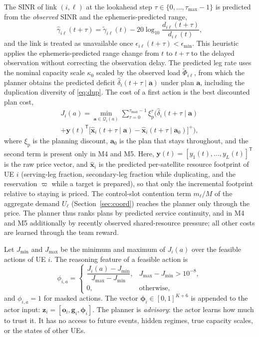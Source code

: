 \documentclass[journal]{IEEEtran}
\begin{document}
The SINR of link $(i,\ell)$ at the lookahead step
$\tau\in\{0,\dots,\tau_{\max}-1\}$ is predicted from the \emph{observed} SINR
and the ephemeris-predicted range,
\begin{equation}
\hat\gamma_{i\ell}(t+\tau)=\tilde\gamma_{i\ell}(t)-20\log_{10}\frac{d_{i\ell}(t+\tau)}{d_{i\ell}(t)},
\end{equation}
and the link is treated as unavailable once $\epsilon_{i\ell}(t+\tau)<\epsilon_{\min}$.
This heuristic applies the ephemeris-predicted range change from $t$ to
$t+\tau$ to the delayed observation without correcting the observation
delay.
The predicted leg rate uses the nominal capacity scale $\kappa_0$ scaled by the
observed load $\tilde\Phi_{i\ell}$, from which the planner obtains the
predicted deficit $\hat\delta_i(t+\tau\mid\mathbf{a})$ under plan
$\mathbf{a}$, including the duplication diversity of \eqref{eq:dup}. The cost
of a first action is the best discounted plan cost,
\begin{multline}
J_i(a)=\min_{\mathbf{a}\in\mathcal{Q}_i(a)}\sum_{\tau=0}^{\tau_{\max}-1}\xi_{\mathrm{p}}^\tau\Big(\hat\delta_i(t+\tau\mid\mathbf{a})\\
+\mathbf{y}(t)^{\mathsf T}\big[\hat{\mathbf{x}}_i(t+\tau\mid\mathbf{a})-\hat{\mathbf{x}}_i(t+\tau\mid\mathbf{a}_0)\big]^+\Big),
\label{eq:plancost}
\end{multline}
where $\xi_{\mathrm{p}}$ is the planning discount, $\mathbf{a}_0$ is the plan
that stays throughout, and the second term is present only in M4 and M5. Here,
$\mathbf{y}(t)=[y_1(t),\ldots,y_L(t)]^{\mathsf T}$ is the raw price vector,
and $\hat{\mathbf{x}}_i$ is the predicted per-satellite resource footprint of
UE $i$ (serving-leg fraction, secondary-leg fraction while duplicating, and
the reservation $\varpi$ while a target is prepared), so that only the
incremental footprint relative to staying is priced. The control-slot
contention term $m_\ell/M$ of the aggregate demand $U_\ell$
(Section~\ref{sec:coord}) reaches the planner only through the price. The
planner thus ranks plans by predicted service continuity, and in M4 and M5
additionally by recently observed shared-resource pressure; all other costs
are learned through the team reward.

Let $J_{\min}$ and $J_{\max}$ be the minimum and maximum of $J_i(a)$ over the
feasible actions of UE $i$. The reasoning feature of a feasible action is
\begin{equation}
\phi_{i,a}=
\begin{cases}
\dfrac{J_i(a)-J_{\min}}{J_{\max}-J_{\min}}, & J_{\max}-J_{\min}>10^{-8},\\[6pt]
0, & \text{otherwise},
\end{cases}
\label{eq:reasoning_feature}
\end{equation}
and $\phi_{i,a}=1$ for masked actions. The vector
$\boldsymbol\phi_i\in[0,1]^{K+6}$ is appended to the actor input:
$\mathbf{z}_i=[\mathbf{o}_i,\mathbf{g}_i,\boldsymbol\phi_i]$. The planner is
\emph{advisory}: the actor learns how much to trust it. It has no access to
future events, hidden regimes, true capacity scales, or the states of other
UEs.
\end{document}
